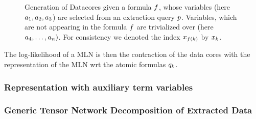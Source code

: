 

\begin{figure}[h]
\begin{center}
	
\end{center}
\caption{Generation of Datacores given a formula $f$, whose variables (here $a_{1},a_{2},a_{3}$) are selected from an extraction query $p$.
	Variables, which are not appearing in the formula $f$ are trivialized over (here $a_{4},\ldots,a_{n})$.
	For consistency we denoted the index $x_{f\left(k\right)}$ by $x_{k}$.}
	\label{fig:datacoreGeneration}
\end{figure}

The log-likelihood of a MLN is then the contraction of the data cores with the representation of the MLN wrt the atomic formulas $q_{k}$.



\subsubsection{Representation with auxiliary term variables}






\subsubsection{Generic Tensor Network Decomposition of Extracted Data}



